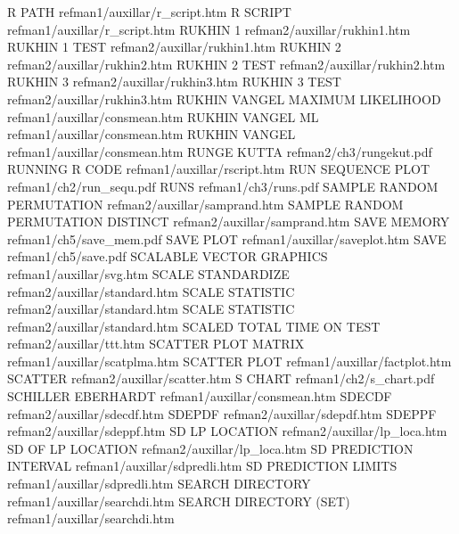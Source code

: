 R PATH                                  refman1/auxillar/r_script.htm
R SCRIPT                                refman1/auxillar/r_script.htm
RUKHIN 1                                refman2/auxillar/rukhin1.htm
RUKHIN 1 TEST                           refman2/auxillar/rukhin1.htm
RUKHIN 2                                refman2/auxillar/rukhin2.htm
RUKHIN 2 TEST                           refman2/auxillar/rukhin2.htm
RUKHIN 3                                refman2/auxillar/rukhin3.htm
RUKHIN 3 TEST                           refman2/auxillar/rukhin3.htm
RUKHIN VANGEL MAXIMUM LIKELIHOOD        refman1/auxillar/consmean.htm
RUKHIN VANGEL ML                        refman1/auxillar/consmean.htm
RUKHIN VANGEL                           refman1/auxillar/consmean.htm
RUNGE KUTTA                             refman2/ch3/rungekut.pdf
RUNNING R CODE                          refman1/auxillar/rscript.htm
RUN SEQUENCE PLOT                       refman1/ch2/run_sequ.pdf
RUNS                                    refman1/ch3/runs.pdf
SAMPLE RANDOM PERMUTATION               refman2/auxillar/samprand.htm
SAMPLE RANDOM PERMUTATION DISTINCT      refman2/auxillar/samprand.htm
SAVE MEMORY                             refman1/ch5/save_mem.pdf
SAVE PLOT                               refman1/auxillar/saveplot.htm
SAVE                                    refman1/ch5/save.pdf
SCALABLE VECTOR GRAPHICS                refman1/auxillar/svg.htm
SCALE STANDARDIZE                       refman2/auxillar/standard.htm
SCALE STATISTIC                         refman2/auxillar/standard.htm
SCALE STATISTIC                         refman2/auxillar/standard.htm
SCALED TOTAL TIME ON TEST               refman2/auxillar/ttt.htm
SCATTER PLOT MATRIX                     refman1/auxillar/scatplma.htm
SCATTER PLOT                            refman1/auxillar/factplot.htm
SCATTER                                 refman2/auxillar/scatter.htm
S CHART                                 refman1/ch2/s_chart.pdf
SCHILLER EBERHARDT                      refman1/auxillar/consmean.htm
SDECDF                                  refman2/auxillar/sdecdf.htm
SDEPDF                                  refman2/auxillar/sdepdf.htm
SDEPPF                                  refman2/auxillar/sdeppf.htm
SD LP LOCATION                          refman2/auxillar/lp_loca.htm
SD OF LP LOCATION                       refman2/auxillar/lp_loca.htm
SD PREDICTION INTERVAL                  refman1/auxillar/sdpredli.htm
SD PREDICTION LIMITS                    refman1/auxillar/sdpredli.htm
SEARCH DIRECTORY                        refman1/auxillar/searchdi.htm
SEARCH DIRECTORY (SET)                  refman1/auxillar/searchdi.htm
